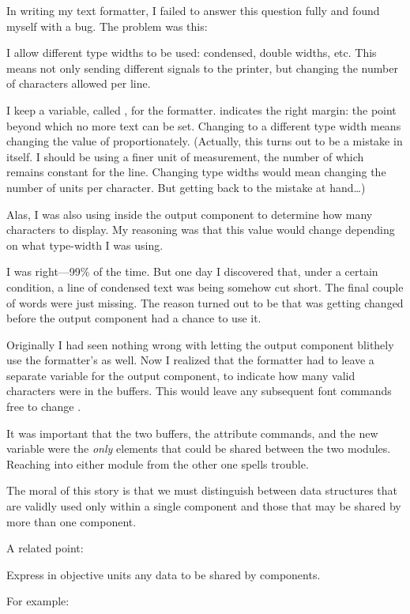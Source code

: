 In writing my text formatter, I failed to answer this question fully
and found myself with a bug. The problem was this:

I allow different type widths to be used: condensed, double widths,
etc. This means not only sending different signals to the printer, but
changing the number of characters allowed per line.

I keep a variable, called , for the formatter.
 indicates the right margin: the point beyond which no
more text can be set. Changing to a different type width means
changing the value of  proportionately.  (Actually, this
turns out to be a mistake in itself. I should be using a finer unit of
measurement, the number of which remains constant for the line.
Changing type widths would mean changing the number of units per
character. But getting back to the mistake at hand\dots)

Alas, I was also using  inside the output component to determine
how many characters to display. My reasoning was that this value would
change depending on what type-width I was using.

I was right---99\% of the time. But one day I discovered that, under
a certain condition, a line of condensed text was being somehow cut
short. The final couple of words were just missing. The reason turned out
to be that  was getting changed before the output component had
a chance to use it.

Originally I had seen nothing wrong with letting the output component
blithely use the formatter's  as well. Now I realized that the
formatter had to leave a separate variable for the output component,
to indicate how many valid characters were in the buffers. This would
leave any subsequent font commands free to change .

It was important that the two buffers, the attribute commands, and the
new variable were the \emph{only} elements that could be shared
between the two modules. Reaching into either module from the other
one spells trouble.

The moral of this story is that we must distinguish between data
structures that are validly used only within a single component and those
that may be shared by more than one component.

A related point:

\begin{tip}
Express in objective units any data to be shared by components.
\end{tip}
For example:

